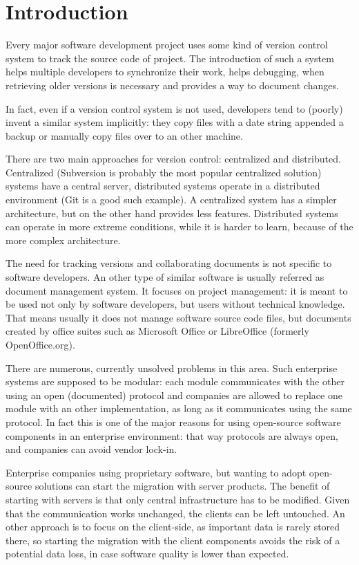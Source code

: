 \chapter{Introduction}

Every major software development project uses some kind of version control
system to track the source code of project. The introduction of such a system
helps multiple developers to synchronize their work, helps debugging, when
retrieving older versions is necessary and provides a way to document changes.

In fact, even if a version control system is not used, developers tend to
(poorly) invent a similar system implicitly: they copy files with a date string
appended a backup or manually copy files over to an other machine.

There are two main approaches for version control: centralized and distributed.
Centralized (Subversion\cite{subversion} is probably the most
popular centralized solution) systems have a central server, distributed
systems operate in a distributed environment (Git\cite{git} is a good such
example). A centralized system has a simpler architecture, but on the other
hand provides less features. Distributed systems can operate in more extreme
conditions, while it is harder to learn, because of the more complex
architecture.

The need for tracking versions and collaborating documents is not specific to
software developers. An other type of similar software is usually referred as
document management system. It focuses on project management: it is meant to be
used  not only by software developers, but users without technical knowledge.
That means usually it does not manage software source code files, but documents
created by office suites such as Microsoft Office\cite{mso} or
LibreOffice\cite{lo} (formerly OpenOffice.org\cite{ooo}).

There are numerous, currently unsolved problems in this area. Such enterprise
systems are supposed to be modular: each module communicates with the other
using an open (documented) protocol and companies are allowed to replace one
module with an other implementation, as long as it communicates using the same
protocol. In fact this is one of the major reasons for using open-source
software components in an enterprise environment: that way protocols are always
open, and companies can avoid vendor lock-in.

Enterprise companies using proprietary software, but wanting to adopt
open-source solutions can start the migration with server products. The benefit
of starting with servers is that only central infrastructure has to be
modified. Given that the communication works unchanged, the clients can be left
untouched. An other approach is to focus on the client-side, as important data
is rarely stored there, so starting the migration with the client components
avoids the risk of a potential data loss, in case software quality is lower
than expected.

